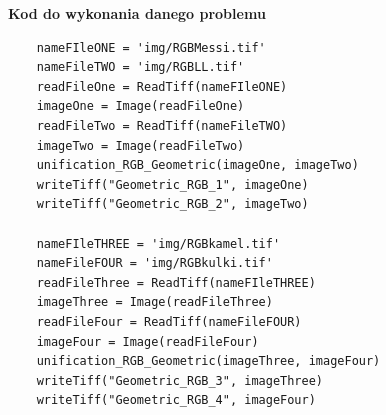 \documentclass[magisterska,openany]{pracadypl}
\begin{document}
\vspace{0.5cm}
\textbf{\Large Kod do wykonania danego problemu}
\lstset{language=Python}
\vspace{0.25cm}
\begin{lstlisting}
	nameFIleONE = 'img/RGBMessi.tif'
	nameFileTWO = 'img/RGBLL.tif'
	readFileOne = ReadTiff(nameFIleONE)
	imageOne = Image(readFileOne)
	readFileTwo = ReadTiff(nameFileTWO)
	imageTwo = Image(readFileTwo)
	unification_RGB_Geometric(imageOne, imageTwo)
	writeTiff("Geometric_RGB_1", imageOne)
	writeTiff("Geometric_RGB_2", imageTwo)
    
	nameFIleTHREE = 'img/RGBkamel.tif'
	nameFileFOUR = 'img/RGBkulki.tif'
	readFileThree = ReadTiff(nameFIleTHREE)
	imageThree = Image(readFileThree)
	readFileFour = ReadTiff(nameFileFOUR)
	imageFour = Image(readFileFour)
	unification_RGB_Geometric(imageThree, imageFour)
	writeTiff("Geometric_RGB_3", imageThree)
	writeTiff("Geometric_RGB_4", imageFour)

\end{lstlisting}
\end{document}
